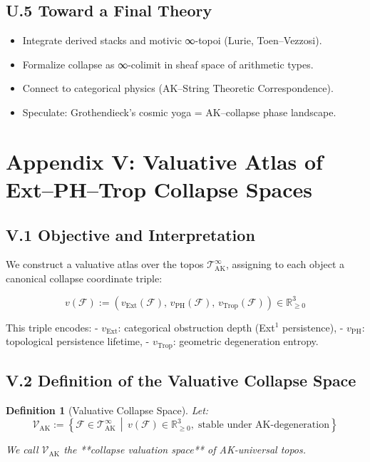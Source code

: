 \documentclass[11pt]{article}
\newtheorem{definition}[theorem]{Definition}
\begin{document}
\subsection*{U.5 Toward a Final Theory}

\begin{itemize}
  \item Integrate derived stacks and motivic ∞-topoi (Lurie, Toen–Vezzosi).
  \item Formalize collapse as ∞-colimit in sheaf space of arithmetic types.
  \item Connect to categorical physics (AK–String Theoretic Correspondence).
  \item Speculate: Grothendieck’s cosmic yoga = AK–collapse phase landscape.
\end{itemize}


\section*{Appendix V: Valuative Atlas of Ext–PH–Trop Collapse Spaces}

\subsection*{V.1 Objective and Interpretation}

We construct a valuative atlas over the topos \( \mathscr{T}_{\mathrm{AK}}^{\infty} \),  
assigning to each object a canonical collapse coordinate triple:

\[
v(\mathcal{F}) := 
\left( v_{\mathrm{Ext}}(\mathcal{F}), \, v_{\mathrm{PH}}(\mathcal{F}), \, v_{\mathrm{Trop}}(\mathcal{F}) \right)
\in \mathbb{R}_{\geq 0}^3
\]

This triple encodes:
- \( v_{\mathrm{Ext}} \): categorical obstruction depth (Ext$^1$ persistence),
- \( v_{\mathrm{PH}} \): topological persistence lifetime,
- \( v_{\mathrm{Trop}} \): geometric degeneration entropy.

\subsection*{V.2 Definition of the Valuative Collapse Space}

\begin{definition}[Valuative Collapse Space]
Let:
\[
\mathscr{V}_{\mathrm{AK}} := 
\left\{
  \mathcal{F} \in \mathscr{T}_{\mathrm{AK}}^{\infty} \,\middle|\,
  v(\mathcal{F}) \in \mathbb{R}_{\geq 0}^3, \;
  \text{stable under AK-degeneration}
\right\}
\]

We call \( \mathscr{V}_{\mathrm{AK}} \) the **collapse valuation space** of AK-universal topos.
\end{definition}
\end{document}
